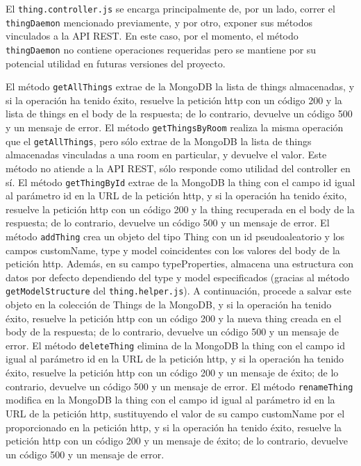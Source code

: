 \vspace{1cm}

El \verb|thing.controller.js| se encarga principalmente de, por un lado, correr el \verb|thingDaemon| mencionado previamente, y por otro, exponer sus métodos vinculados a la API REST.
En este caso, por el momento, el método \verb|thingDaemon| no contiene operaciones requeridas pero se mantiene por su potencial utilidad en futuras versiones del proyecto.

\vspace{0.5cm}

El método \verb|getAllThings| extrae de la MongoDB la lista de things almacenadas, y si la operación ha tenido éxito, resuelve la petición http con un código 200 y la lista de things en el body de la respuesta; de lo contrario, devuelve un código 500 y un mensaje de error.
El método \verb|getThingsByRoom| realiza la misma operación que el \verb|getAllThings|, pero sólo extrae de la MongoDB la lista de things almacenadas vinculadas a una room en particular, y devuelve el valor. Este método no atiende a la API REST, sólo responde como utilidad del controller en sí.
El método \verb|getThingById| extrae de la MongoDB la thing con el campo id igual al parámetro id en la URL de la petición http, y si la operación ha tenido éxito, resuelve la petición http con un código 200 y la thing recuperada en el body de la respuesta; de lo contrario, devuelve un código 500 y un mensaje de error.
El método \verb|addThing| crea un objeto del tipo Thing con un id pseudoaleatorio y los campos customName, type y model coincidentes con los valores del body de la petición http. Además, en su campo typeProperties, almacena una estructura con datos por defecto dependiendo del type y model especificados (gracias al método \verb|getModelStructure| del \verb|thing.helper.js|). A continuación, procede a salvar este objeto en la colección de Things de la MongoDB, y si la operación ha tenido éxito, resuelve la petición http con un código 200 y la nueva thing creada en el body de la respuesta; de lo contrario, devuelve un código 500 y un mensaje de error.
El método \verb|deleteThing| elimina de la MongoDB la thing con el campo id igual al parámetro id en la URL de la petición http, y si la operación ha tenido éxito, resuelve la petición http con un código 200 y un mensaje de éxito; de lo contrario, devuelve un código 500 y un mensaje de error.
El método \verb|renameThing| modifica en la MongoDB la thing con el campo id igual al parámetro id en la URL de la petición http, sustituyendo el valor de su campo customName por el proporcionado en la petición http, y si la operación ha tenido éxito, resuelve la petición http con un código 200 y un mensaje de éxito; de lo contrario, devuelve un código 500 y un mensaje de error.
